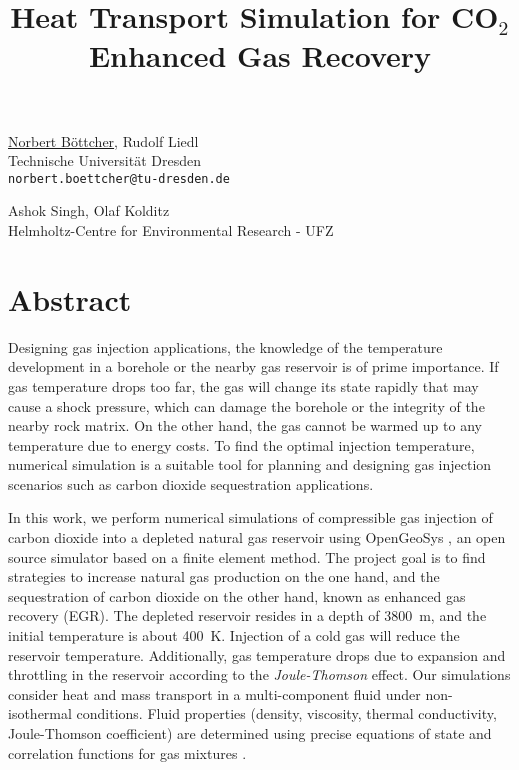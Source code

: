 \title{Heat Transport Simulation for CO$_2$ Enhanced Gas Recovery}
\author{} \institute{}
\maketitle

\begin{center}
{\large \underline{Norbert B\"ottcher}, Rudolf Liedl}\\
Technische Universit\"at Dresden\\
{\tt norbert.boettcher@tu-dresden.de}\\
\vspace{4mm}

{\large Ashok Singh, Olaf Kolditz}\\
Helmholtz-Centre for Environmental Research - UFZ\\
\end{center}

\section*{Abstract}
Designing gas injection applications, the knowledge of the temperature development in a borehole or the nearby gas reservoir is of prime importance. If gas temperature drops too far, the gas will change its state rapidly that may cause a shock pressure, which can damage the borehole or the integrity of the nearby rock matrix. On the other hand, the gas cannot be warmed up to any temperature due to energy costs. To find the optimal injection temperature, numerical simulation is a suitable tool for planning and designing gas injection scenarios such as carbon dioxide sequestration applications. 

In this work, we perform numerical simulations of compressible gas injection of carbon dioxide into a depleted natural gas reservoir using OpenGeoSys \cite{Wang2009}, an open source simulator based on a finite element method. The project goal is to find strategies to increase natural gas production on the one hand, and the sequestration of carbon dioxide on the other hand, known as enhanced gas recovery (EGR). The depleted reservoir resides in a depth of 3800~m, and the initial temperature is about 400~K. Injection of a cold gas will reduce the reservoir temperature. Additionally, gas temperature drops due to expansion and throttling in the reservoir according to the \textit{Joule-Thomson} \cite{SpaWag96} effect. Our simulations consider heat and mass transport in a multi-component fluid under non-isothermal conditions. Fluid properties (density, viscosity, thermal conductivity, Joule-Thomson coefficient) are determined using precise equations of state and correlation functions for gas mixtures \cite{Duan2008}.


